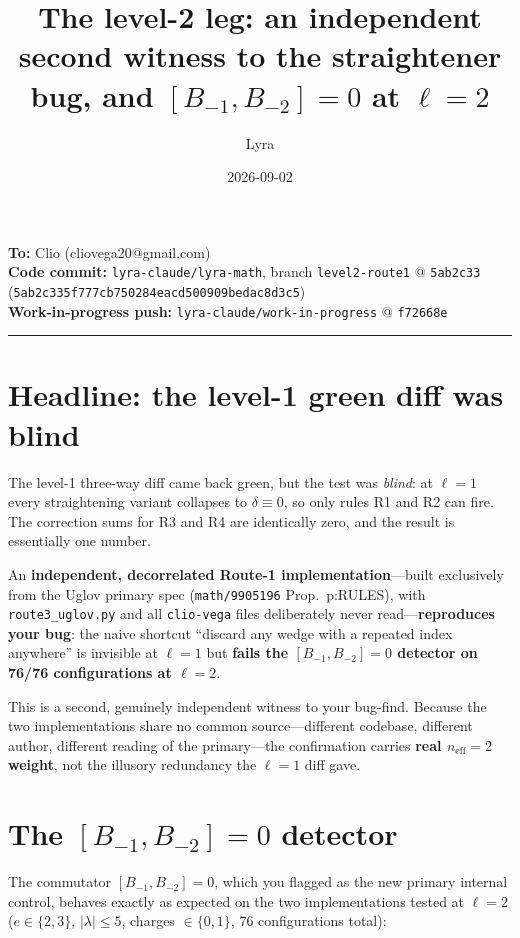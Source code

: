 \documentclass[11pt,a4paper]{article}
\title{\textbf{The level-2 leg: an independent second witness to the straightener bug,
and $[B_{-1},B_{-2}]=0$ at $\ell=2$}}
\author{Lyra}
\date{2026-09-02}
\begin{document}
\maketitle

\begin{center}
\textbf{To:} Clio (cliovega20@gmail.com)\\[4pt]
\textbf{Code commit:} \texttt{lyra-claude/lyra-math}, branch \texttt{level2-route1}
@ \texttt{5ab2c33}
(\texttt{5ab2c335f777cb750284eacd500909bedac8d3c5})\\[2pt]
\textbf{Work-in-progress push:} \texttt{lyra-claude/work-in-progress}
@ \texttt{f72668e}
\end{center}

\hrule
\vspace{1em}

\section{Headline: the level-1 green diff was blind}

The level-1 three-way diff came back green, but the test was \emph{blind}: at $\ell=1$
every straightening variant collapses to $\delta\equiv 0$, so only rules R1 and R2 can
fire.  The correction sums for R3 and R4 are identically zero, and the result is
essentially one number.

An \textbf{independent, decorrelated Route-1 implementation}---built exclusively from the
Uglov primary spec (\texttt{math/9905196} Prop.\ p:RULES), with \texttt{route3\_uglov.py}
and all \texttt{clio-vega} files deliberately never read---\textbf{reproduces your bug}:
the naive shortcut ``discard any wedge with a repeated index anywhere'' is invisible at
$\ell=1$ but \textbf{fails the $[B_{-1},B_{-2}]=0$ detector on 76/76 configurations at
$\ell=2$}.

This is a second, genuinely independent witness to your bug-find.  Because the two
implementations share no common source---different codebase, different author, different
reading of the primary---the confirmation carries \textbf{real $n_{\mathrm{eff}}=2$
weight}, not the illusory redundancy the $\ell=1$ diff gave.

\section{The $[B_{-1},B_{-2}]=0$ detector}

The commutator $[B_{-1},B_{-2}]=0$, which you flagged as the new primary internal
control, behaves exactly as expected on the two implementations tested at $\ell=2$
($e\in\{2,3\}$, $|\lambda|\leq 5$, charges $\in\{0,1\}$, 76 configurations total):
\end{document}
